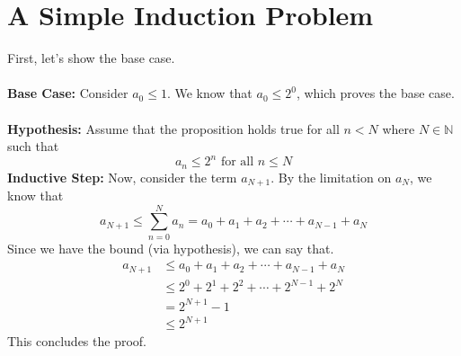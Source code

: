 \section{A Simple Induction Problem}

First, let's show the base case.\\
\\
\textbf{Base Case:} Consider $a_0 \leq 1$. We know that $a_0 \leq 2^0$, which proves the base case.\\
\\
\textbf{Hypothesis:} Assume that the proposition holds true for all $n < N$ where $N \in \mathbb{N}$ such that
$$
a_n \leq 2^n \text{ for all } n \leq N
$$
\textbf{Inductive Step:} Now, consider the term $a_{N+1}$. By the limitation on $a_N$, we know that
$$
a_{N+1} \leq \sum_{n=0}^N a_n = a_0 + a_1 + a_2 + \cdots + a_{N-1} + a_N
$$
Since we have the bound (via hypothesis), we can say that.
\begin{align*}
    a_{N+1} &\leq a_0 + a_1 + a_2 + \cdots + a_{N-1} + a_N\\
    &\leq 2^0 + 2^1 + 2^2 + \cdots + 2^{N-1} + 2^{N} \\
    &= 2^{N+1} - 1 \\
    &\leq 2^{N+1}
\end{align*}
This concludes the proof.

